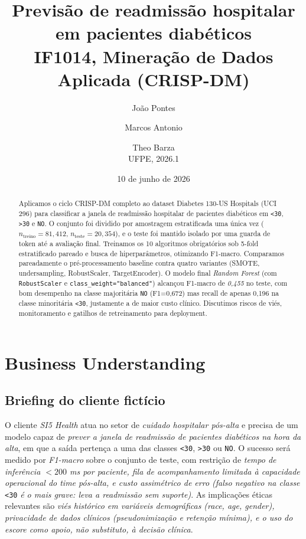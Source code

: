 \documentclass[12pt,a4paper]{article}
\title{Previsão de readmissão hospitalar em pacientes diabéticos\\\large IF1014, Mineração de Dados Aplicada (CRISP-DM)}
\author{João Pontes \and Marcos Antonio \and Theo Barza \\ UFPE, 2026.1}
\date{10 de junho de 2026}
\begin{document}
\maketitle

\begin{abstract}
Aplicamos o ciclo CRISP-DM completo ao dataset Diabetes 130-US Hospitals (UCI 296) para classificar a janela de readmissão hospitalar de pacientes diabéticos em \texttt{<30}, \texttt{>30} e \texttt{NO}. O conjunto foi dividido por amostragem estratificada uma única vez ($n_{\text{treino}}=81{,}412$, $n_{\text{teste}}=20{,}354$), e o teste foi mantido isolado por uma guarda de token até a avaliação final. Treinamos os 10 algoritmos obrigatórios sob 5-fold estratificado pareado e busca de hiperparâmetros, otimizando F1-macro. Comparamos pareadamente o pré-processamento baseline contra quatro variantes (SMOTE, undersampling, RobustScaler, TargetEncoder). O modelo final \emph{Random Forest} (com \texttt{RobustScaler} e \texttt{class\_weight="balanced"}) alcançou F1-macro de \emph{0{,}455} no teste, com bom desempenho na classe majoritária \texttt{NO} (F1=0{,}672) mas recall de apenas 0{,}196 na classe minoritária \texttt{<30}, justamente a de maior custo clínico. Discutimos riscos de viés, monitoramento e gatilhos de retreinamento para deployment.
\end{abstract}

\tableofcontents
\newpage

\section{Business Understanding}
\subsection{Briefing do cliente fictício}

O cliente \emph{SI5 Health} atua no setor de \emph{cuidado hospitalar pós-alta} e precisa de um modelo capaz de \emph{prever a janela de readmissão de pacientes diabéticos na hora da alta}, em que a saída pertença a uma das classes \texttt{<30}, \texttt{>30} ou \texttt{NO}. O sucesso será medido por \emph{F1-macro} sobre o conjunto de teste, com restrição de \emph{tempo de inferência $<200$ ms por paciente, fila de acompanhamento limitada à capacidade operacional do time pós-alta, e custo assimétrico de erro (falso negativo na classe} \texttt{<30} \emph{é o mais grave: leva a readmissão sem suporte)}. As implicações éticas relevantes são \emph{viés histórico em variáveis demográficas (race, age, gender), privacidade de dados clínicos (pseudonimização e retenção mínima), e o uso do escore como apoio, não substituto, à decisão clínica}.
\end{document}
